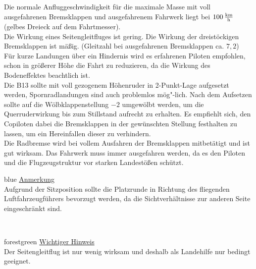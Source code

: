 Die normale Anfluggeschwindigkeit für die maximale Masse mit voll ausgefahrenen Bremsklappen und ausgefahrenem Fahrwerk liegt bei $\unit[100]{\frac{km}{h}}$ (gelbes Dreieck auf dem Fahrtmesser).\\
Die Wirkung eines Seitengleitfluges ist gering. Die Wirkung der dreistöckigen Bremsklappen ist mäßig. (Gleitzahl bei ausgefahrenen Bremsklappen ca. $7,2$) \\
Für kurze Landungen über ein Hindernis wird es erfahrenen Piloten empfohlen, schon in größerer Höhe die Fahrt zu reduzieren, da die Wirkung des Bodeneffektes beachtlich ist.\\
Die B13 sollte mit voll gezogenem Höhenruder in 2-Punkt-Lage aufgesetzt werden, Spornradlandungen sind auch problemlos mög"-lich. Nach dem Aufsetzen sollte auf die Wölbklappenstellung $-2$ umgewölbt werden, um die Querruderwirkung bis zum Stillstand aufrecht zu erhalten. Es empfiehlt sich, den Copiloten dabei die Bremsklappen in der gewünschten Stellung festhalten zu lassen, um ein Hereinfallen dieser zu verhindern. \\
Die Radbremse wird bei vollem Ausfahren der Bremsklappen mitbetätigt und ist gut wirksam.
Das Fahrwerk muss immer ausgefahren werden, da es den Piloten und die Flugzeugstruktur vor starken Landestößen schützt.\\
\newline
\begin{color}{blue}
\large{\underline{Anmerkung}}\\
Aufgrund der Sitzposition sollte die Platzrunde in Richtung des fliegenden Luftfahrzeugführers bevorzugt werden, da die Sichtverhältnisse zur anderen Seite eingeschränkt sind.
\end{color}\\
\newline
\begin{color}{forestgreen}
\large{\underline{Wichtiger Hinweis}}\\
Der Seitengleitflug ist nur wenig wirksam und deshalb als Landehilfe nur bedingt geeignet.
\end{color}\\
